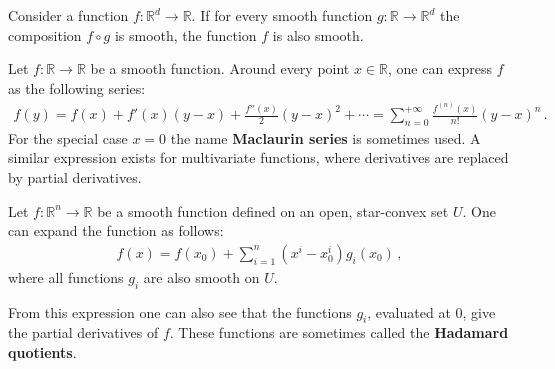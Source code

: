 
    \begin{theorem}[Boman]
        Consider a function $f:\mathbb{R}^d\rightarrow\mathbb{R}$. If for every smooth function $g:\mathbb{R}\rightarrow\mathbb{R}^d$ the composition $f\circ g$ is smooth, the function $f$ is also smooth.
    \end{theorem}

    \begin{property}
        Let $f:\mathbb{R}\rightarrow\mathbb{R}$ be a smooth function. Around every point $x\in\mathbb{R}$, one can express $f$ as the following series:
        \begin{gather}
            f(y) = f(x) + f'(x)(y-x) + \frac{f''(x)}{2}(y-x)^2 + \cdots = \sum_{n=0}^{+\infty}\frac{f^{(n)}(x)}{n!}(y-x)^n\,.
        \end{gather}
        For the special case $x=0$ the name \textbf{Maclaurin series} is sometimes used. A similar expression exists for multivariate functions, where derivatives are replaced by partial derivatives.
    \end{property}


    \begin{theorem}
        Let $f:\mathbb{R}^n\rightarrow\mathbb{R}$ be a smooth function defined on an open, star-convex set $U$. One can expand the function as follows:
        \begin{gather}
            f(x) = f(x_0) + \sum_{i=1}^n(x^i-x^i_0)g_i(x_0)\,,
        \end{gather}
        where all functions $g_i$ are also smooth on $U$.
    \end{theorem}
    From this expression one can also see that the functions $g_i$, evaluated at 0, give the partial derivatives of $f$. These functions are sometimes called the \textbf{Hadamard quotients}.

